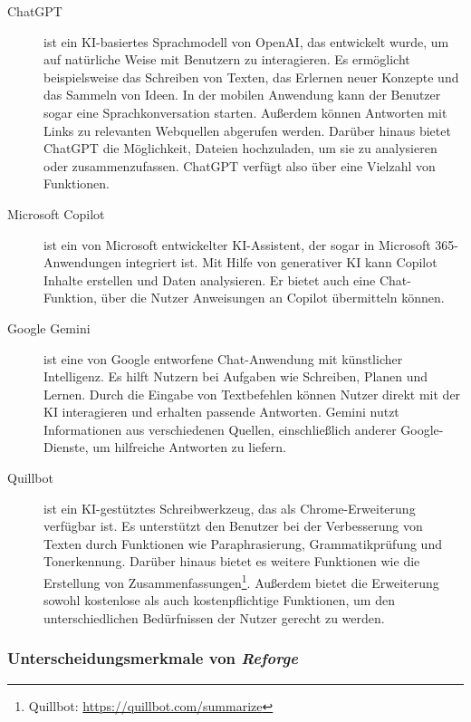 \begin{description}
    \item[Chat\ac{GPT}] ist ein \ac{KI}-basiertes Sprachmodell von OpenAI, das entwickelt wurde, um auf natürliche Weise mit Benutzern zu interagieren. Es ermöglicht beispielsweise das Schreiben von Texten, das Erlernen neuer Konzepte und das Sammeln von Ideen. In der mobilen Anwendung kann der Benutzer sogar eine Sprachkonversation starten. Außerdem können Antworten mit Links zu relevanten Webquellen abgerufen werden. Darüber hinaus bietet Chat\ac{GPT} die Möglichkeit, Dateien hochzuladen, um sie zu analysieren oder zusammenzufassen. Chat\ac{GPT} verfügt also über eine Vielzahl von Funktionen. \cite{openai_overview}

    \item[Microsoft Copilot] ist ein von Microsoft entwickelter \ac{KI}-Assistent, der sogar in Microsoft 365-Anwendungen integriert ist. Mit Hilfe von generativer \ac{KI} kann Copilot Inhalte erstellen und Daten analysieren. Er bietet auch eine Chat-Funktion, über die Nutzer Anweisungen an Copilot übermitteln können. \cite{microsoft_copilot_overview}

    \item[Google Gemini] ist eine von Google entworfene Chat-Anwendung mit künstlicher Intelligenz. Es hilft Nutzern bei Aufgaben wie Schreiben, Planen und Lernen. Durch die Eingabe von Textbefehlen können Nutzer direkt mit der \ac{KI} interagieren und erhalten passende Antworten. Gemini nutzt Informationen aus verschiedenen Quellen, einschließlich anderer Google-Dienste, um hilfreiche Antworten zu liefern. \cite{Gemini_overview}

    \item[Quillbot] ist ein \ac{KI}-gestütztes Schreibwerkzeug, das als Chrome-Erweiterung verfügbar ist. Es unterstützt den Benutzer bei der Verbesserung von Texten durch Funktionen wie Paraphrasierung, Grammatikprüfung und Tonerkennung. Darüber hinaus bietet es weitere Funktionen wie die Erstellung von Zusammenfassungen\footnote[1]{Quillbot: \href{https://quillbot.com/summarize}{https://quillbot.com/summarize}}. Außerdem bietet die Erweiterung sowohl kostenlose als auch kostenpflichtige Funktionen, um den unterschiedlichen Bedürfnissen der Nutzer gerecht zu werden.
    
\end{description}

\subsubsection{Unterscheidungsmerkmale von \textit{Reforge}}

